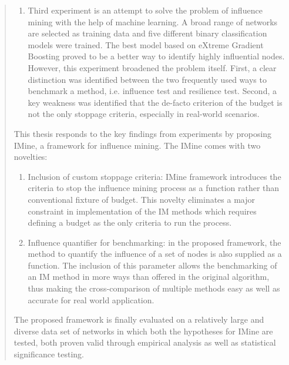 \begin{abstract}
\begin{enumerate}
	\item Third experiment is an attempt to solve the problem of influence mining with the help of machine learning. A broad range of networks are selected as training data and five different binary classification models were trained. The best model based on eXtreme Gradient Boosting proved to be a better way to identify highly influential nodes. However, this experiment broadened the problem itself. First, a clear distinction was identified between the two frequently used ways to benchmark a method, i.e. influence test and resilience test. Second, a key weakness was identified that the de-facto criterion of the budget is not the only stoppage criteria, especially in real-world scenarios.
\end{enumerate}

This thesis responds to the key findings from experiments by proposing IMine, a framework for influence mining. The IMine comes with two novelties:

\begin{enumerate}
	\item Inclusion of custom stoppage criteria: IMine framework introduces the criteria to stop the influence mining process as a function rather than conventional fixture of budget. This novelty eliminates a major constraint in implementation of the IM methods which requires defining a budget as the only criteria to run the process.
	
	\item Influence quantifier for benchmarking: in the proposed framework, the method to quantify the influence of a set of nodes is also supplied as a function. The inclusion of this parameter allows the benchmarking of an IM method in more ways than offered in the original algorithm, thus making the cross-comparison of multiple methods easy as well as accurate for real world application.
\end{enumerate}

The proposed framework is finally evaluated on a relatively large and diverse data set of networks in which both the hypotheses for IMine are tested, both proven valid through empirical analysis as well as statistical significance testing.

\end{abstract}
